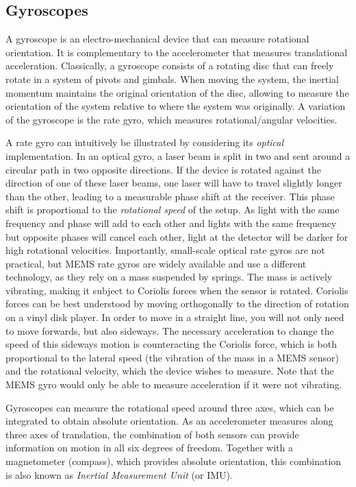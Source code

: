 \subsection{Gyroscopes}\label{sec:gyroscopes}

A gyroscope is an electro-mechanical device that can measure rotational orientation. It is complementary to the accelerometer that measures translational acceleration. Classically, a gyroscope consists of a rotating disc that can freely rotate in a system of pivots and gimbals. When moving the system, the inertial momentum maintains the original orientation of the disc, allowing to measure the orientation of the system relative to where the system was originally. A variation of the gyroscope is the rate gyro, which measures rotational/angular velocities.

A rate gyro  can intuitively be illustrated by considering its \textsl{optical} implementation.
In an optical gyro, a laser beam is split in two and sent around a circular path in two opposite directions. If the device is rotated against the direction of one of these laser beams, one laser will have to travel slightly longer than the other, leading to a measurable phase shift at the receiver.
This phase shift is proportional to the \textsl{rotational speed} of the setup. As light with the same frequency and phase will add to each other and lights with the same frequency but opposite phases will cancel each other, light at the detector will be darker for high rotational velocities.
Importantly, small-scale optical rate gyros are not practical, but MEMS rate gyros are widely available and use a different technology, as they rely on a mass suspended by springs. The mass is actively vibrating, making it subject to Coriolis forces when the sensor is rotated. Coriolis forces can be best understood by moving orthogonally to the direction of rotation on a vinyl disk player. In order to move in a straight line, you will not only need to move forwards, but also sideways. The necessary acceleration to change the speed of this sideways motion is counteracting the Coriolis force, which is both proportional to the lateral speed (the vibration of the mass in a MEMS sensor) and the rotational velocity, which the device wishes to measure. Note that the MEMS gyro would only be able to measure acceleration if it were not vibrating.

Gyroscopes can measure the rotational speed around three axes, which can be integrated to obtain absolute orientation. As an accelerometer measures along three axes of translation, the combination of both sensors can provide information on motion in all six degrees of freedom. Together with a magnetometer (compass), which provides absolute orientation, this combination is also known as \textsl{Inertial Measurement Unit} (or IMU).

